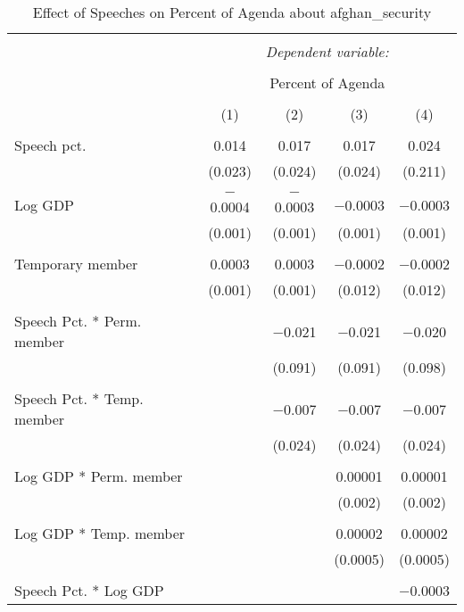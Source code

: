 
\begin{table}[!htbp] \centering 
  \caption{Effect of Speeches on Percent of Agenda about  afghan_security} 
  \label{} 
\begin{tabular}{@{\extracolsep{5pt}}lcccc} 
\\[-1.8ex]\hline 
\hline \\[-1.8ex] 
 & \multicolumn{4}{c}{\textit{Dependent variable:}} \\ 
\cline{2-5} 
\\[-1.8ex] & \multicolumn{4}{c}{Percent of Agenda} \\ 
\\[-1.8ex] & (1) & (2) & (3) & (4)\\ 
\hline \\[-1.8ex] 
 Speech pct. & 0.014 & 0.017 & 0.017 & 0.024 \\ 
  & (0.023) & (0.024) & (0.024) & (0.211) \\ 
  & & & & \\ 
 Log GDP & $-$0.0004 & $-$0.0003 & $-$0.0003 & $-$0.0003 \\ 
  & (0.001) & (0.001) & (0.001) & (0.001) \\ 
  & & & & \\ 
 Temporary member & 0.0003 & 0.0003 & $-$0.0002 & $-$0.0002 \\ 
  & (0.001) & (0.001) & (0.012) & (0.012) \\ 
  & & & & \\ 
 Speech Pct. * Perm. member &  & $-$0.021 & $-$0.021 & $-$0.020 \\ 
  &  & (0.091) & (0.091) & (0.098) \\ 
  & & & & \\ 
 Speech Pct. * Temp. member &  & $-$0.007 & $-$0.007 & $-$0.007 \\ 
  &  & (0.024) & (0.024) & (0.024) \\ 
  & & & & \\ 
 Log GDP * Perm. member &  &  & 0.00001 & 0.00001 \\ 
  &  &  & (0.002) & (0.002) \\ 
  & & & & \\ 
 Log GDP * Temp. member &  &  & 0.00002 & 0.00002 \\ 
  &  &  & (0.0005) & (0.0005) \\ 
  & & & & \\ 
 Speech Pct. * Log GDP &  &  &  & $-$0.0003 \\ 

\end{tabular}
\end{table}
